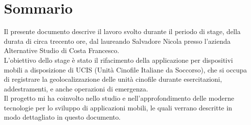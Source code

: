 
\cleardoublepage
{}
{}
\begingroup
\let\clearpage\relax
\let\cleardoublepage\relax
\let\cleardoublepage\relax

\chapter*{Sommario}

Il presente documento descrive il lavoro svolto durante il periodo di stage, della durata
di circa trecento ore, dal laureando Salvadore Nicola presso l'azienda Alternative Studio
di Costa Francesco.\\
\noindent L'obiettivo dello stage è stato il rifacimento della applicazione per
dispositivi mobili a disposizione di UCIS (Unità Cinofile Italiane da Soccorso), che si occupa di
registrare la geolocalizzazione delle unità cinofile durante  esercitazioni,
addestramenti, e anche operazioni di emergenza. \\
\noindent Il progetto mi ha coinvolto nello studio e nell'approfondimento delle moderne tecnologie per lo sviluppo di applicazioni mobili,
le quali verrano descritte in modo dettagliato in questo documento.

%
%

\endgroup

\vfill
